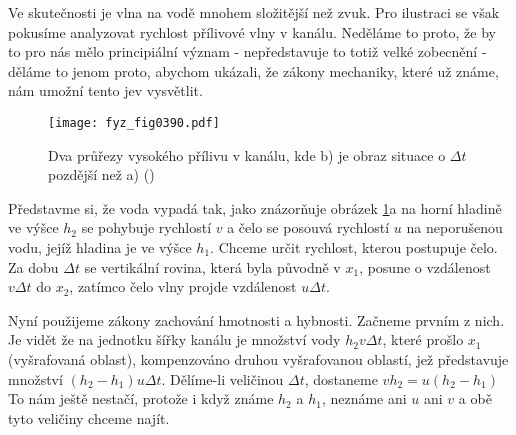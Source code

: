   Ve skutečnosti je vlna na vodě mnohem složitější než zvuk. Pro ilustraci se však pokusíme 
  analyzovat rychlost přílivové vlny v kanálu. Neděláme to proto, že by to pro nás mělo 
  principiální význam - nepředstavuje to totiž velké zobecnění - děláme to jenom proto, abychom 
  ukázali, že zákony mechaniky, které už známe, nám umožní tento jev vysvětlit. 
  
  \begin{figure}[ht!] %
    \centering
    \texttt{[image: fyz\_fig0390.pdf]}
    \caption{Dva průřezy vysokého přílivu v kanálu, kde b) je obraz situace o \(\Delta t\)
                 pozdější než a)
             (\cite[s.~689]{Feynman01})}
    \label{fyz:fig0390}
  \end{figure}
  
  Představme si, že voda vypadá tak, jako znázorňuje obrázek \ref{fyz:fig0390}a na horní hladině ve 
  výšce \(h_2\) se pohybuje rychlostí \(v\) a čelo se posouvá rychlostí \(u\) na neporušenou vodu, 
  jejíž hladina je ve výšce \(h_1\). Chceme určit rychlost, kterou postupuje čelo. Za dobu \(\Delta 
  t\) se vertikální rovina, která byla původně v \(x_1\), posune o vzdálenost \(v\Delta t\) do 
  \(x_2\), zatímco čelo vlny projde vzdálenost \(u\Delta t\).
  
  Nyní použijeme zákony zachování hmotnosti a hybnosti. Začneme prvním z nich. Je vidět že na 
  jednotku šířky kanálu je množství vody \(h_2v\Delta t\), které prošlo \(x_1\) (vyšrafovaná 
  oblast), kompenzováno druhou vyšrafovanou oblastí, jež představuje množství \((h_2-h_1)u\Delta 
  t\). Dělíme-li veličinou \(\Delta t\), dostaneme \(vh_2=u(h_2-h_1)\) To nám ještě nestačí, 
  protože i když známe \(h_2\) a \(h_1\), neznáme ani \(u\) ani \(v\) a obě tyto veličiny chceme 
  najít. 
  
